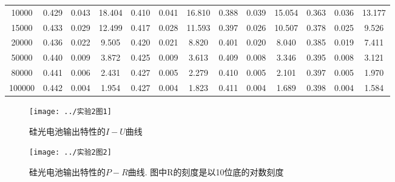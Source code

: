 \documentclass[11pt]{article}
\begin{document}
\begin{table}[htbp]
\begin{tabular}{ccccccccccccc}
		10000  & 0.429      & 0.043      & 18.404      & 0.410       & 0.041      & 16.810      & 0.388      & 0.039      & 15.054     & 0.363     & 0.036     & 13.177     \\
		15000  & 0.433      & 0.029      & 12.499      & 0.417       & 0.028      & 11.593      & 0.397      & 0.026      & 10.507     & 0.378     & 0.025     & 9.526      \\
		20000  & 0.436      & 0.022      & 9.505       & 0.420       & 0.021      & 8.820       & 0.401      & 0.020      & 8.040      & 0.385     & 0.019     & 7.411      \\
		50000  & 0.440      & 0.009      & 3.872       & 0.425       & 0.009      & 3.613       & 0.409      & 0.008      & 3.346      & 0.395     & 0.008     & 3.121      \\
		80000  & 0.441      & 0.006      & 2.431       & 0.427       & 0.005      & 2.279       & 0.410      & 0.005      & 2.101      & 0.397     & 0.005     & 1.970      \\
		100000 & 0.442      & 0.004      & 1.954       & 0.427       & 0.004      & 1.823       & 0.411      & 0.004      & 1.689      & 0.398     & 0.004     & 1.584      \\ \bottomrule
	\end{tabular}
\end{table}
\begin{figure}[htbp]
	\centering
	\texttt{[image: ../实验2图1]}
	\caption{硅光电池输出特性的$ I-U $曲线}
	\label{fig:21}
\end{figure}
\begin{figure}[htbp]
	\centering
	\texttt{[image: ../实验2图2]}
	\caption{硅光电池输出特性的$ P-R $曲线. \kaishu 图中R的刻度是以10位底的对数刻度}
	\label{fig:22}
\end{figure}
\end{document}
